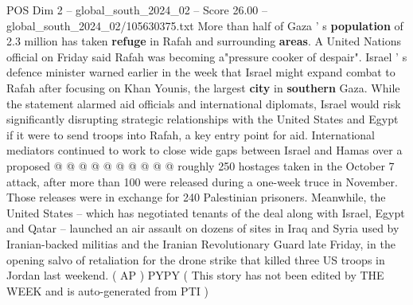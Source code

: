\begin{textsample}{POS Dim 2 – global\_south\_2024\_02 – Score 26.00 – global\_south\_2024\_02/105630375.txt}
More than half of Gaza ' s \textbf{population} of 2.3 million has taken \textbf{refuge} in Rafah and surrounding \textbf{areas}.
A United Nations official on Friday said Rafah was becoming a"pressure cooker of despair".
Israel ' s defence minister warned earlier in the week that Israel might expand combat to Rafah after focusing on Khan Younis, the largest \textbf{city} in \textbf{southern} Gaza.
While the statement alarmed aid officials and international diplomats, Israel would risk significantly disrupting strategic relationships with the United States and Egypt if it were to send troops into Rafah, a key entry point for aid.
International mediators continued to work to close wide gaps between Israel and Hamas over a proposed @ @ @ @ @ @ @ @ @ @ roughly 250 hostages taken in the October 7 attack, after more than 100 were released during a one-week truce in November.
Those releases were in exchange for 240 Palestinian prisoners.
Meanwhile, the United States -- which has negotiated tenants of the deal along with Israel, Egypt and Qatar -- launched an air assault on dozens of sites in Iraq and Syria used by Iranian-backed militias and the Iranian Revolutionary Guard late Friday, in the opening salvo of retaliation for the drone strike that killed three US troops in Jordan last weekend. ( AP ) PYPY ( This story has not been edited by THE WEEK and is auto-generated from PTI )

\end{textsample}
